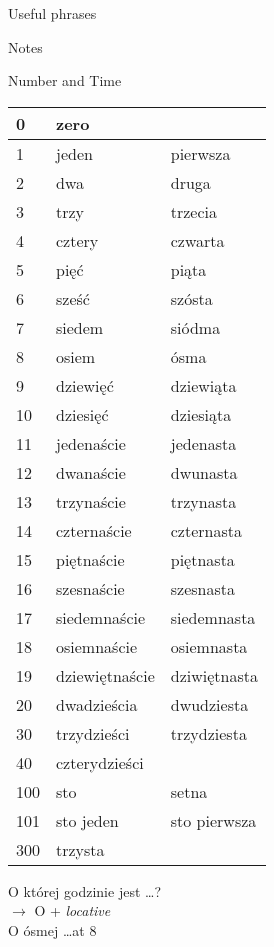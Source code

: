 \documentclass[10pt,twoside]{../filofax2}
\begin{document}
\begin{ffpage}{\Huge Useful phrases}
\entry{}{}
\end{ffpage}
\begin{ffpage}{\Huge Notes}
\end{ffpage}

\begin{ffpage}{\Huge Number and Time }
\begin{tabular}{|m{0.5cm}|m{2.5cm}|m{2.5cm}|}
	\hline
	0 & zero&\\\hline
	1 & jeden & pierwsza \\\hline
	2& dwa & druga\\\hline
	3 & trzy &trzecia\\\hline
	4 & cztery & czwarta\\\hline
	5 & pi\k{e}\'{c} & pi\k{a}ta\\\hline
	6 & sze\'{s}\'{c} & sz\'{o}sta\\\hline
	7 & siedem & si\'{o}dma \\\hline
	8 & osiem & \'{o}sma \\\hline
	9 & dziewi\k{e}\'{c} & dziewi\k{a}ta\\\hline
	10& dziesi\k{e}\'{c}& dziesi\k{a}ta\\\hline
	11& jedena\'{s}cie& jedenasta\\\hline
	12& dwana\'{s}cie& dwunasta\\\hline
	13& trzyna\'{s}cie& trzynasta\\\hline
	14& czterna\'{s}cie& czternasta\\\hline
	15& pi\k{e}tna\'{s}cie& pi\k{e}tnasta\\\hline
	16& szesna\'{s}cie & szesnasta\\\hline
	17& siedemna\'{s}cie & siedemnasta\\\hline
	18& osiemna\'{s}cie &osiemnasta\\\hline
	19& dziewi\k{e}tna\'{s}cie& dziwi\k{e}tnasta\\\hline
	20& dwadzie\'scia& dwudziesta\\\hline
	30& trzydzie\'{s}ci&trzydziesta\\\hline
	40& czterydzie\'{s}ci& \\\hline
	100& sto &setna	\\\hline
	101& sto jeden&sto pierwsza\\\hline
	300&trzysta&\\\hline
	\end{tabular}
	\vspace{5mm}
	
	
	O kt\'{o}rej godzinie jest \dots? \\$\rightarrow$
	O + {\it locative}\\
	O \'{o}smej \dots at 8
\end{ffpage}
\end{document}
